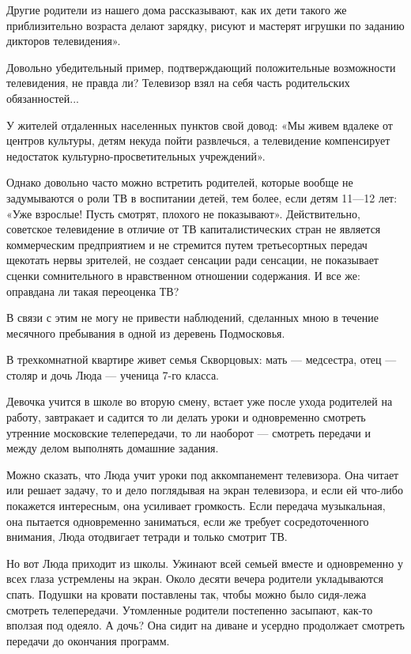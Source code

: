 \documentclass[12pt, a4paper, openany]{book}
\begin{document}
Другие родители из нашего дома рассказывают, как их дети такого же приблизительно возраста делают зарядку, рисуют и мастерят игрушки по заданию дикторов телевидения». 

Довольно убедительный пример, подтверждающий положительные возможности телевидения, не правда ли? Телевизор взял на себя часть родительских обязанностей... 

У жителей отдаленных населенных пунктов свой довод: «Мы живем вдалеке от центров культуры, детям некуда пойти развлечься, а телевидение компенсирует недостаток культурно-просветительных учреждений». 

Однако довольно часто можно встретить родителей, которые вообще не задумываются о роли ТВ в воспитании детей, тем более, если детям 11—12 лет: «Уже взрослые! Пусть смотрят, плохого не показывают». Действительно, советское телевидение в отличие от ТВ капиталистических стран не является коммерческим предприятием и не стремится путем третьесортных передач щекотать нервы зрителей, не создает сенсации ради сенсации, не показывает сценки сомнительного в нравственном отношении содержания. И все же: оправдана ли такая переоценка ТВ? 

В связи с этим не могу не привести наблюдений, сделанных мною в течение месячного пребывания в одной из деревень Подмосковья. 

В трехкомнатной квартире живет семья Скворцовых: мать — медсестра, отец — столяр и дочь Люда — ученица 7-го класса. 

Девочка учится в школе во вторую смену, встает уже после ухода родителей на работу, завтракает и садится то ли делать уроки и одновременно смотреть утренние московские телепередачи, то ли наоборот — смотреть передачи и между делом выполнять домашние задания. 
 
Можно сказать, что Люда учит уроки под аккомпанемент телевизора. Она читает или решает задачу, то и дело поглядывая на экран телевизора, и если ей что-либо покажется интересным, она усиливает громкость. Если передача музыкальная, она пытается одновременно заниматься, если же требует сосредоточенного внимания, Люда отодвигает тетради и только смотрит ТВ. 

Но вот Люда приходит из школы. Ужинают всей семьей вместе и одновременно у всех глаза устремлены на экран. Около десяти вечера родители укладываются спать. Подушки на кровати поставлены так, чтобы можно было сидя-лежа смотреть телепередачи. Утомленные родители постепенно засыпают, как-то вползая под одеяло. А дочь? Она сидит на диване и усердно продолжает смотреть передачи до окончания программ. 
\end{document}
